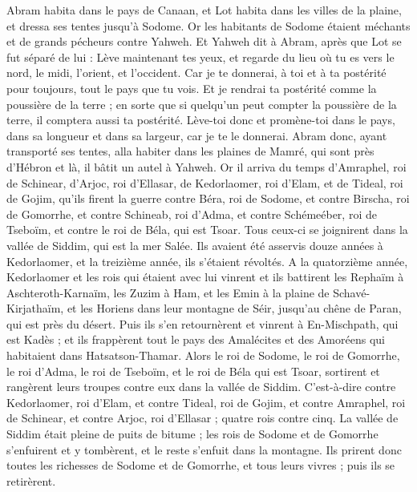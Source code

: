 \begin{multicols}{2}
Abram habita dans le pays de Canaan, et Lot habita dans les villes de la plaine, et dressa ses tentes jusqu'à Sodome.
Or les habitants de Sodome étaient méchants et de grands pécheurs contre Yahweh.
Et Yahweh dit à Abram, après que Lot se fut séparé de lui : Lève maintenant tes yeux, et regarde du lieu où tu es vers le nord, le midi, l'orient, et l'occident.
Car je te donnerai, à toi et à ta postérité pour toujours, tout le pays que tu vois.
Et je rendrai ta postérité comme la poussière de la terre ; en sorte que si quelqu'un peut compter la poussière de la terre, il comptera aussi ta postérité.
Lève-toi donc et promène-toi dans le pays, dans sa longueur et dans sa largeur, car je te le donnerai.
Abram donc, ayant transporté ses tentes, alla habiter dans les plaines de Mamré, qui sont près d'Hébron et là, il bâtit un autel à Yahweh.
\VerseOne{}Or il arriva du temps d'Amraphel, roi de Schinear, d'Arjoc, roi d'Ellasar, de Kedorlaomer, roi d'Elam, et de Tideal, roi de Gojim,
qu'ils firent la guerre contre Béra, roi de Sodome, et contre Birscha, roi de Gomorrhe, et contre Schineab, roi d'Adma, et contre Schémeéber, roi de Tseboïm, et contre le roi de Béla, qui est Tsoar.
Tous ceux-ci se joignirent dans la vallée de Siddim, qui est la mer Salée.
Ils avaient été asservis douze années à Kedorlaomer, et la treizième année, ils s'étaient révoltés.
A la quatorzième année, Kedorlaomer et les rois qui étaient avec lui vinrent et ils battirent les Rephaïm à Aschteroth-Karnaïm, les Zuzim à Ham, et les Emin à la plaine de Schavé-Kirjathaïm,
et les Horiens dans leur montagne de Séir, jusqu'au chêne de Paran, qui est près du désert.
Puis ils s'en retournèrent et vinrent à En-Mischpath, qui est Kadès ; et ils frappèrent tout le pays des Amalécites et des Amoréens qui habitaient dans Hatsatson-Thamar.
Alors le roi de Sodome, le roi de Gomorrhe, le roi d'Adma, le roi de Tseboïm, et le roi de Béla qui est Tsoar, sortirent et rangèrent leurs troupes contre eux dans la vallée de Siddim.
C'est-à-dire contre Kedorlaomer, roi d'Elam, et contre Tideal, roi de Gojim, et contre Amraphel, roi de Schinear, et contre Arjoc, roi d'Ellasar ; quatre rois contre cinq.
La vallée de Siddim était pleine de puits de bitume ; les rois de Sodome et de Gomorrhe s'enfuirent et y tombèrent, et le reste s'enfuit dans la montagne.
Ils prirent donc toutes les richesses de Sodome et de Gomorrhe, et tous leurs vivres ; puis ils se retirèrent.

\end{multicols}
